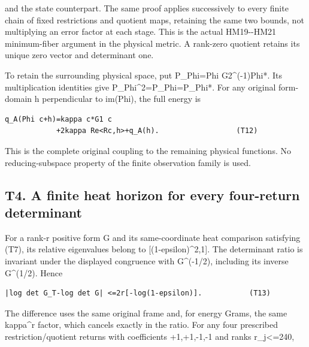 \documentclass[11pt,a4paper]{article}
\renewcommand{\[}{\begingroup\small\originaldisplaystart}
\renewcommand{\]}{\originaldisplayend\endgroup}
\begin{document}
and the state counterpart. The same proof applies successively to every
finite chain of fixed restrictions and quotient maps, retaining the same
two bounds, not multiplying an error factor at each stage. This is the
actual HM19-\/-HM21 minimum-fiber argument in the physical metric. A
rank-zero quotient retains its unique zero vector and determinant one.

To retain the surrounding physical space, put P\_Phi=Phi G2\^{}(-1)Phi*.
Its multiplication identities give
{P\allowbreak{}\_\allowbreak{}P\allowbreak{}h\allowbreak{}i\allowbreak{}\textasciicircum{}\allowbreak{}2\allowbreak{}=\allowbreak{}P\allowbreak{}\_\allowbreak{}P\allowbreak{}h\allowbreak{}i\allowbreak{}=\allowbreak{}P\allowbreak{}\_\allowbreak{}P\allowbreak{}h\allowbreak{}i\allowbreak{}*\allowbreak{}.\allowbreak{}}
For any original form-domain h perpendicular to im(Phi), the full energy
is

\begin{verbatim}
q_A(Phi c+h)=kappa c*G1 c
            +2kappa Re<Rc,h>+q_A(h).                  (T12)
\end{verbatim}

This is the complete original coupling to the remaining physical
functions. No reducing-subspace property of the finite observation
family is used.

\subsection{T4. A finite heat horizon for every four-return
determinant}\label{t4.-a-finite-heat-horizon-for-every-four-return-determinant}

For a rank-r positive form G and its same-coordinate heat comparison
satisfying (T7), its relative eigenvalues belong to
{[}(1-epsilon)\^{}2,1{]}. The determinant ratio is invariant under the
displayed congruence with G\^{}(-1/2), including its inverse G\^{}(1/2).
Hence

\begin{verbatim}
|log det G_T-log det G| <=2r[-log(1-epsilon)].           (T13)
\end{verbatim}

The difference uses the same original frame and, for energy Grams, the
same kappa\^{}r factor, which cancels exactly in the ratio. For any four
prescribed
{r\allowbreak{}e\allowbreak{}s\allowbreak{}t\allowbreak{}r\allowbreak{}i\allowbreak{}c\allowbreak{}t\allowbreak{}i\allowbreak{}o\allowbreak{}n\allowbreak{}/\allowbreak{}q\allowbreak{}u\allowbreak{}o\allowbreak{}t\allowbreak{}i\allowbreak{}e\allowbreak{}n\allowbreak{}t\allowbreak{}}
returns with coefficients +1,+1,-1,-1 and ranks r\_j\textless=240,
\end{document}
